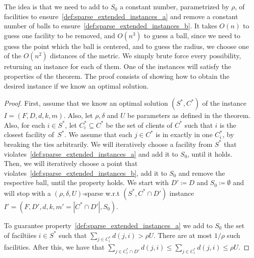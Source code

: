 The idea is that we need to add to $S_0$ a constant number, parametrized by $\rho$, of facilities to ensure~\ref{def:sparse_extended_instances_a} and remove a constant number of balls to ensure~\ref{def:sparse_extended_instances_b}. It takes $O(n)$ to guess one facility to be removed, and $O(n^3)$ to guess a ball, since we need to guess the point which the ball is centered, and to guess the radius, we choose one of the $O(n^2)$ distances of the metric. We simply brute force every possibility, returning an instance for each of them. One of the instances will satisfy the properties of the theorem. The proof consists of showing how to obtain the desired instance if we know an optimal solution.

\begin{proof}
    First, assume that we know an optimal solution $(S^*,C^*)$ of the instance $I = (F,D,d,k,m)$. Also, let $\rho,\delta$ and $U$ be parameters as defined in the theorem. Also, for each $i \in S^*$, let $C_i^* \subseteq C^*$ be the set of clients of $C^*$ such that $i$ is the closest facility of~$S^*$. We assume that each $j \in C^*$ is in exactly in one $C_i^*$, by breaking the ties arbitrarily. We will iteratively choose a facility from $S^*$ that violates~\ref{def:sparse_extended_instances_a} and add it to $S_0$, until it holds. Then, we will iteratively choose a point that violates~\ref{def:sparse_extended_instances_b}, add it to $S_0$ and remove the respective ball, until the property holds. We start with $D' \coloneqq D$ and $S_0 \coloneqq \emptyset$ and will stop with a $(\rho,\delta,U)$-sparse w.r.t $(S^*,C^* \cap D')$ instance $I' = (F,D',d,k,m' = |C^* \cap D'|,S_0)$.

    To guarantee property~\ref{def:sparse_extended_instances_a} we add to $S_0$ the set of faciltiies $i \in S^*$ such that $\sum_{j \in C_i^*} d(j, i) > \rho U$. There are at most $1/\rho$ such facilities. After this, we have that $\sum_{j \in C_i^* \cap D'} d(j,i) \leq \sum_{j \in C_i^*} d(j, i) \leq \rho U$.


\end{proof}
